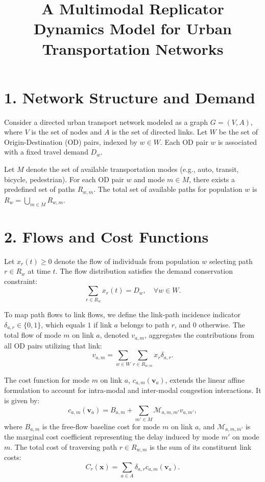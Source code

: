 \documentclass[12pt,a4paper]{article}
\title{\vspace{-1cm}\textbf{A Multimodal Replicator Dynamics Model for Urban Transportation Networks}}
\author{}
\date{}
\begin{document}
\maketitle
\vspace{-1.5cm}

\section*{1. Network Structure and Demand}
Consider a directed urban transport network modeled as a graph $G = (V, A)$, where $V$ is the set of nodes and $A$ is the set of directed links. Let $W$ be the set of Origin-Destination (OD) pairs, indexed by $w \in W$. Each OD pair $w$ is associated with a fixed travel demand $D_w$. 

Let $M$ denote the set of available transportation modes (e.g., auto, transit, bicycle, pedestrian). For each OD pair $w$ and mode $m \in M$, there exists a predefined set of paths $R_{w,m}$. The total set of available paths for population $w$ is $R_w = \bigcup_{m \in M} R_{w,m}$.

\section*{2. Flows and Cost Functions}
Let $x_r(t) \ge 0$ denote the flow of individuals from population $w$ selecting path $r \in R_w$ at time $t$. The flow distribution satisfies the demand conservation constraint:
\begin{equation}
    \sum_{r \in R_w} x_r(t) = D_w, \quad \forall w \in W.
\end{equation}

To map path flows to link flows, we define the link-path incidence indicator $\delta_{a,r} \in \{0, 1\}$, which equals $1$ if link $a$ belongs to path $r$, and $0$ otherwise. The total flow of mode $m$ on link $a$, denoted $v_{a,m}$, aggregates the contributions from all OD pairs utilizing that link:
\begin{equation}
    v_{a,m} = \sum_{w \in W} \sum_{r \in R_{w,m}} x_r \delta_{a,r}.
\end{equation}

The cost function for mode $m$ on link $a$, $c_{a,m}(\mathbf{v}_a)$, extends the linear affine formulation to account for intra-modal and inter-modal congestion interactions. It is given by:
\begin{equation}
    c_{a,m}(\mathbf{v}_a) = B_{a,m} + \sum_{m' \in M} \mathcal{M}_{a, m, m'} v_{a,m'},
\end{equation}
where $B_{a,m}$ is the free-flow baseline cost for mode $m$ on link $a$, and $\mathcal{M}_{a, m, m'}$ is the marginal cost coefficient representing the delay induced by mode $m'$ on mode $m$. The total cost of traversing path $r \in R_{w,m}$ is the sum of its constituent link costs:
\begin{equation}
    C_r(\mathbf{x}) = \sum_{a \in A} \delta_{a,r} c_{a,m}(\mathbf{v}_a).
\end{equation}
\end{document}
